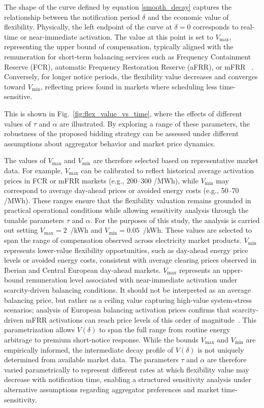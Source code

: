 \documentclass[preprint,12pt]{elsarticle}
\begin{document}
The shape of the curve defined by equation \ref{smooth_decay} captures the relationship between the notification period \( \delta \) and the economic value of flexibility. Physically, the left endpoint of the curve at \( \delta = 0 \) corresponds to real-time or near-immediate activation. The value at this point is set to \( V_{\max} \), representing the upper bound of compensation, typically aligned with the remuneration for short-term balancing services such as Frequency Containment Reserve (FCR), automatic Frequency Restoration Reserve (aFRR), or mFRR ~\cite{entsoe_balancing}. Conversely, for longer notice periods, the flexibility value decreases and converges toward \( V_{\min} \), reflecting prices found in markets where scheduling less time-sensitive.

This is shown in Fig.~\ref{fig:flex_value_vs_time}, where the effects of different values of \( \tau \) and \( \alpha \) are illustrated. By exploring a range of these parameters, the robustness of the proposed bidding strategy can be assessed under different assumptions about aggregator behavior and market price dynamics.

The values of \( V_{\max} \) and \( V_{\min} \) are therefore selected based on representative market data. For example, \( V_{\max} \) can be calibrated to reflect historical average activation prices in FCR or mFRR markets (e.g., 200–300 \texteuro/MWh), while \( V_{\min} \) may correspond to average day-ahead prices or avoided energy costs (e.g., 50–70 \texteuro/MWh). These ranges ensure that the flexibility valuation remains grounded in practical operational conditions while allowing sensitivity analysis through the tunable parameters \( \tau \) and \( \alpha \). For the purposes of this study, the analysis is carried out setting $V_{\max} = 2$~\texteuro/kWh and $V_{\min} = 0.05$~\texteuro/kWh. These values are selected to span the range of compensation observed across electricity market products. $V_{\min}$ represents lower-value flexibility opportunities, such as day-ahead energy price levels or avoided energy costs, consistent with average clearing prices observed in Iberian and Central European day-ahead markets. $V_{\max}$ represents an upper-bound remuneration level associated with near-immediate activation under scarcity-driven balancing conditions. It should not be interpreted as an average balancing price, but rather as a ceiling value capturing high-value system-stress scenarios; analysis of European balancing activation prices confirms that scarcity-driven mFRR activations can reach price levels of this order of magnitude~\cite{entsoe_balancing}. This parametrization allows $V(\delta)$ to span the full range from routine energy arbitrage to premium short-notice response. While the bounds $V_{\max}$ and $V_{\min}$ are empirically informed, the intermediate decay profile of $V(\delta)$ is not uniquely determined from available market data. The parameters $\tau$ and $\alpha$ are therefore varied parametrically to represent different rates at which flexibility value may decrease with notification time, enabling a structured sensitivity analysis under alternative assumptions regarding aggregator preferences and market time-sensitivity.
\end{document}
